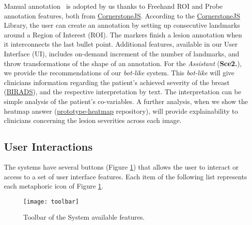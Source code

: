 \hfill


Manual annotation~\cite{cao2015collaborative} is adopted by us thanks to Freehand ROI and Probe annotation features, both from \hyperlink{https://cornerstonejs.org/}{CornerstoneJS}. According to the \hyperlink{https://cornerstonejs.org/}{CornerstoneJS} Library, the user can create an annotation by setting up consecutive landmarks around a Region of Interest (ROI). The markers finish a lesion annotation when it interconnects the last bullet point. Additional features, available in our User Interface (UI), includes on-demand increment of the number of landmarks, and throw transformations of the shape of an annotation. For the \textit{Assistant} (\textbf{Sce2.}), we provide the recommendations of our \textit{bot-like} system. This \textit{bot-like} will give clinicians information regarding the patient's achieved severity of the breast (\hyperlink{https://en.wikipedia.org/wiki/BI-RADS}{BIRADS}), and the respective interpretation by text. The interpretation can be simple analysis of the patient's co-variables. A further analysis, when we show the heatmap answer (\hyperlink{https://github.com/mida-project/prototype-heatmap}{prototype-heatmap} repository), will provide explainability to clinicians concerning the lesion severities across each image.

\clearpage


\subsection{User Interactions}

The systems have several buttons (Figure \ref{fig:toolbar}) that allows the user to interact or access to a set of user interface features. Each item of the following list represents each metaphoric icon of Figure \ref{fig:toolbar}.


\hfill

\begin{figure}[h]
\centering
\texttt{[image: toolbar]}
\caption{Toolbar of the System available features.}
\label{fig:toolbar}
\end{figure}


